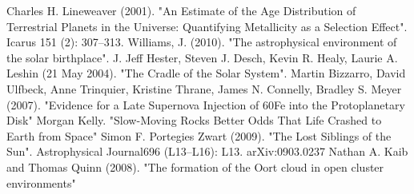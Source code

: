\documentclass[letterpaper, 10 pt, conference]{ieeeconf}  %
\begin{document}
\begin{thebibliography}{99}
Charles H. Lineweaver (2001). "An Estimate of the Age Distribution of Terrestrial Planets in the Universe: Quantifying Metallicity as a Selection Effect". Icarus 151 (2): 307–313.
Williams, J. (2010). "The astrophysical environment of the solar birthplace".
J. Jeff Hester, Steven J. Desch, Kevin R. Healy, Laurie A. Leshin (21 May 2004). "The Cradle of the Solar System".
Martin Bizzarro, David Ulfbeck, Anne Trinquier, Kristine Thrane, James N. Connelly, Bradley S. Meyer (2007). "Evidence for a Late Supernova Injection of 60Fe into the Protoplanetary Disk"
Morgan Kelly. "Slow-Moving Rocks Better Odds That Life Crashed to Earth from Space"
Simon F. Portegies Zwart (2009). "The Lost Siblings of the Sun". Astrophysical Journal696 (L13–L16): L13. arXiv:0903.0237
Nathan A. Kaib and Thomas Quinn (2008). "The formation of the Oort cloud in open cluster environments"

\end{thebibliography}
\end{document}
